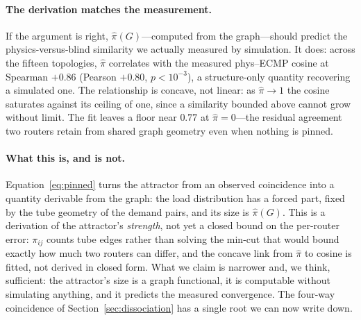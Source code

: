 \paragraph{The derivation matches the measurement.} If the argument is right,
$\widehat{\pi}(G)$---computed from the graph---should predict the
physics-versus-blind similarity we actually measured by simulation. It does:
across the fifteen topologies, $\widehat{\pi}$ correlates with the measured
phys--ECMP cosine at Spearman $+0.86$ (Pearson $+0.80$, $p<10^{-3}$), a
structure-only quantity recovering a simulated one. The relationship is
concave, not linear: as $\widehat{\pi}\!\to\!1$ the cosine saturates against its
ceiling of one, since a similarity bounded above cannot grow without limit. The
fit leaves a floor near $0.77$ at $\widehat{\pi}=0$---the residual agreement two
routers retain from shared graph geometry even when nothing is pinned.

\paragraph{What this is, and is not.} Equation~\eqref{eq:pinned} turns the
attractor from an observed coincidence into a quantity derivable from the graph:
the load distribution has a forced part, fixed by the tube geometry of the
demand pairs, and its size is $\widehat{\pi}(G)$. This is a derivation of the
attractor's \emph{strength}, not yet a closed bound on the per-router error:
$\pi_{ij}$ counts tube edges rather than solving the min-cut that would bound
exactly how much two routers can differ, and the concave link from
$\widehat{\pi}$ to cosine is fitted, not derived in closed form. What we claim is
narrower and, we think, sufficient: the attractor's size is a graph functional,
it is computable without simulating anything, and it predicts the measured
convergence. The four-way coincidence of Section~\ref{sec:dissociation} has a
single root we can now write down.
